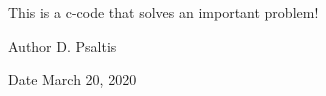 This is a c-\/code that solves an important problem!

\begin{DoxyAuthor}{Author}
D. Psaltis
\end{DoxyAuthor}
\begin{DoxyDate}{Date}
March 20, 2020 
\end{DoxyDate}
